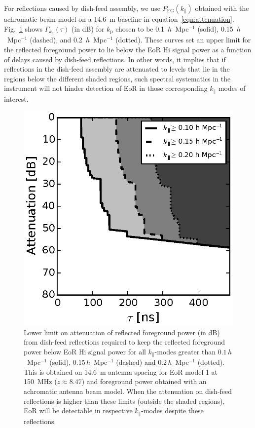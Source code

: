 \documentclass[preprint2,iop,numberedappendix,twocolappendix,appendixfloats]{emulateapj}
\begin{document}
For reflections caused by dish-feed assembly, we use $P_\textrm{FG}(k_\parallel)$ obtained with the achromatic beam model on a 14.6~m baseline in equation~\ref{eqn:attenuation}. Fig.~\ref{fig:fg-reflections-achrmbeam} shows $\Gamma_{k_\textrm{p}}(\tau)$ (in dB) for $k_\textrm{p}$ chosen to be 0.1~$h$~Mpc$^{-1}$ (solid), 0.15~$h$~Mpc$^{-1}$ (dashed), and 0.2~$h$~Mpc$^{-1}$ (dotted). These curves set an upper limit for the reflected foreground power to lie below the EoR H{\sc i} signal power as a function of delays caused by dish-feed reflections. In other words, it implies that if reflections in the dish-feed assembly are attenuated to levels that lie in the regions below the different shaded regions, such spectral systematics in the instrument will not hinder detection of EoR in those corresponding $k_\parallel$ modes of interest. 

\begin{figure}[htb]
\centering
\includegraphics[width=\linewidth]{spec_on_achrmbeam_foreground_reflected_power_21cmfast_14.6m_150.0_MHz_subband_v2.eps}
\caption{Lower limit on attenuation of reflected foreground power (in dB) from dish-feed reflections required to keep the reflected foreground power below EoR H{\sc i} signal power for all $k_\parallel$-modes greater than $0.1\,h$~Mpc$^{-1}$ (solid), $0.15\,h$~Mpc$^{-1}$ (dashed) and $0.2\,h$~Mpc$^{-1}$ (dotted). This is obtained on 14.6~m antenna spacing for EoR model 1 at 150~MHz ($z\approx 8.47$) and foreground power obtained with an achromatic antenna beam model. When the attenuation on dish-feed reflections is higher than these limits (outside the shaded regions), EoR will be detectable in respective $k_\parallel$-modes despite these reflections.}
\label{fig:fg-reflections-achrmbeam}
\end{figure}
\end{document}
